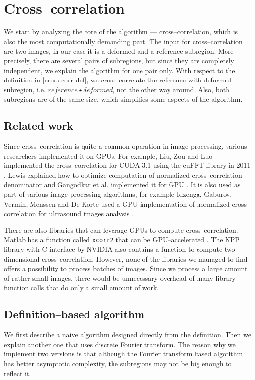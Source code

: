\fi



\section{Cross--correlation}
We start by analyzing the core of the algorithm --- cross--correlation, which is also the most computationally demanding part. The input for cross--correlation are two images, in our case it is a deformed and a reference subregion. More precisely, there are several pairs of subregions, but since they are completely independent, we explain the algorithm for one pair only. With respect to the definition in \cref{cross-corr-def}, we cross--correlate the reference with deformed subregion, i.e. $reference \star deformed$, not the other way around. Also, both subregions are of the same size, which simplifies some aspects of the algorithm.

\subsection{Related work}

Since cross--correlation is quite a common operation in image processing, various researchers implemented it on GPUs. For example, Liu, Zou and Luo implemented the cross--correlation for CUDA 3.1 using the cuFFT library in 2011 \cite{liu2011gpu}. Lewis explained how to optimize computation of normalized cross--correlation denominator \cite{lewisfast} and Gangodkar et al. implemented it for GPU \cite{gandokar2012fastNCCGPU}. It is also used as part of various image processing algorithms, for example Idzenga, Gaburov, Vermin, Menssen and De Korte used a GPU implementation of normalized cross--correlation for ultrasound images analysis \cite{Idzenga2014Ultrasonics}.

There are also libraries that can leverage GPUs to compute cross--cor\-re\-la\-tion. Matlab has a function called \texttt{xcorr2} that can be GPU--accelerated \cite{MATLAB:2018}. The NPP library with C interface by NVIDIA \cite{NPP} also contains a function to compute two--dimensional cross--correlation. However, none of the libraries we managed to find offers a possibility to process batches of images. Since we process a large amount of rather small images, there would be unnecessary overhead of many library function calls that do only a small amount of work.

\subsection{Definition--based algorithm}
We first describe a naive algorithm designed directly from the definition. Then we explain another one that uses discrete Fourier transform. The reason why we implement two versions is that although the Fourier transform based algorithm has better asymptotic complexity, the subregions may not be big enough to reflect it.

